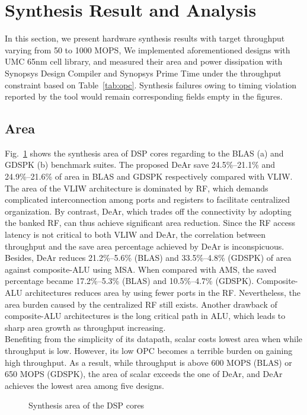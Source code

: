 \section{Synthesis Result and Analysis}
{
    In this section, we present hardware synthesis results with target throughput varying from 50 to 1000 MOPS, 
    We implemented aforementioned designs with UMC 65nm cell library, 
    and measured their area and power dissipation with Synopsys Design Compiler and Synopsys Prime Time under the throughput constraint based on Table~\ref{tab:opc}.
    Synthesis failures owing to timing violation reported by the tool would remain corresponding fields empty in the figures.
    \subsection{Area}
    Fig.~\ref{chart:area} shows the synthesis area of DSP cores regarding to the BLAS (a) and GDSPK (b) benchmark suites.
    The proposed DeAr save 24.5\%--21.1\% and 24.9\%--21.6\% of area in BLAS and GDSPK respectively compared with VLIW.
    The area of the VLIW architecture is dominated by RF, 
    which demands complicated interconnection among ports and registers to facilitate centralized organization.
    By contrast, DeAr, which trades off the connectivity by adopting the banked RF, can thus achieve significant area reduction.
    Since the RF access latency is not critical to both VLIW and DeAr, 
    the correlation between throughput and the save area percentage achieved by DeAr is inconspicuous.
    \\\indent Besides, DeAr reduces 21.2\%--5.6\% (BLAS) and 33.5\%--4.8\% (GDSPK) of area against composite-ALU using MSA.
    When compared with AMS, the saved percentage became 17.2\%--5.3\% (BLAS) and 10.5\%--4.7\% (GDSPK).
    Composite-ALU architectures reduces area by using fewer ports in the RF.
    Nevertheless, the area burden caused by the centralized RF still exists.
    Another drawback of composite-ALU architectures is the long critical path in ALU, 
    which leads to sharp area growth as throughput increasing.
    \\\indent Benefiting from the simplicity of its datapath, 
    scalar costs lowest area when while throughput is low.
    However, its low OPC becomes a terrible burden on gaining high throughput.
    As a result, while throughput is above 600 MOPS (BLAS) or 650 MOPS (GDSPK), 
    the area of scalar exceeds the one of DeAr, 
    and DeAr achieves the lowest area among five designs.
    \vspace{\textfig}
    \begin{figure}[!ht]
        \begin{center}
        \end{center}
        \caption{Synthesis area of the DSP cores}
        \label{chart:area}
    \end{figure}
}

